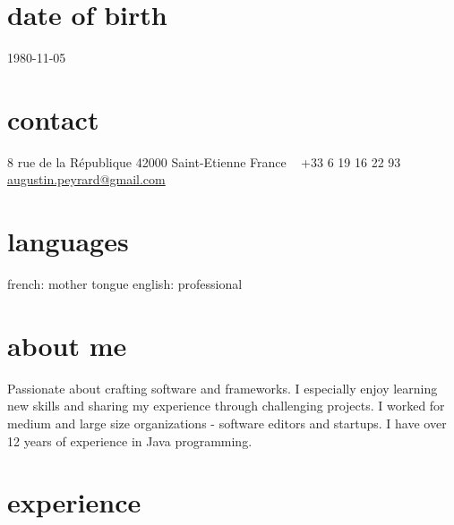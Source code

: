 \documentclass[]{k-cv} %
\begin{document}


\begin{aside} %
\section{date of birth}
\color{gray}1980-11-05
\section{contact}
8 rue de la R\'{e}publique
42000 Saint-Etienne
France
~
+33 6 19 16 22 93
~
\href{mailto:augustin.peyrard@gmail.com}{augustin.peyrard@gmail.com}
\section{languages}
french: mother tongue
english: professional
\end{aside}


\section{about me}
\begin{freetext}
{Passionate about crafting software and frameworks.
I especially enjoy learning new skills and sharing my experience through challenging projects.
I worked for medium and large size organizations - software editors and startups.
I have over 12 years of experience in Java programming.}
\end{freetext}

\section{experience}
\end{document}
